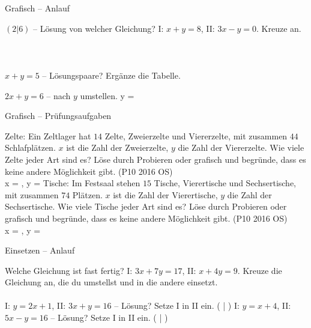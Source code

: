 \setcounter{aufgabe}{24}

\begin{aufgabe}{Grafisch – Anlauf}
\begin{teile}
\teil $(2|6)$ – Lösung von welcher Gleichung? I: $x + y = 8$, II: $3x - y = 0$. Kreuze an.\\ \\ \\ \\ 
\teil $x + y = 5$ – Lösungspaare? Ergänze die Tabelle.

\teil $2x + y = 6$ – nach $y$ umstellen. y = \leerfeld
\end{teile}
\end{aufgabe}

\begin{aufgabe}{Grafisch – Prüfungsaufgaben}
\begin{teile}
\steil Zelte: Ein Zeltlager hat $14$ Zelte, Zweierzelte und Viererzelte, mit zusammen $44$ Schlafplätzen. $x$ ist die Zahl der Zweierzelte, $y$ die Zahl der Viererzelte. Wie viele Zelte jeder Art sind es? Löse durch Probieren oder grafisch und begründe, dass es keine andere Möglichkeit gibt. \hfill (P10 2016 OS) \\ x = \leerfeld , y = \leerfeld
\steil Tische: Im Festsaal stehen $15$ Tische, Vierertische und Sechsertische, mit zusammen $74$ Plätzen. $x$ ist die Zahl der Vierertische, $y$ die Zahl der Sechsertische. Wie viele Tische jeder Art sind es? Löse durch Probieren oder grafisch und begründe, dass es keine andere Möglichkeit gibt. \hfill (P10 2016 OS) \\ x = \leerfeld , y = \leerfeld
\end{teile}
\end{aufgabe}

\begin{aufgabe}{Einsetzen – Anlauf}
\begin{teile}
\teil Welche Gleichung ist fast fertig? I: $3x + 7y = 17$, II: $x + 4y = 9$. Kreuze die Gleichung an, die du umstellst und in die andere einsetzt.\\ \\ 
\teil I: $y = 2x + 1$, II: $3x + y = 16$ – Lösung? Setze I in II ein. ( \leerfeld | \leerfeld )
\teil I: $y = x + 4$, II: $5x - y = 16$ – Lösung? Setze I in II ein. ( \leerfeld | \leerfeld )
\end{teile}
\end{aufgabe}

